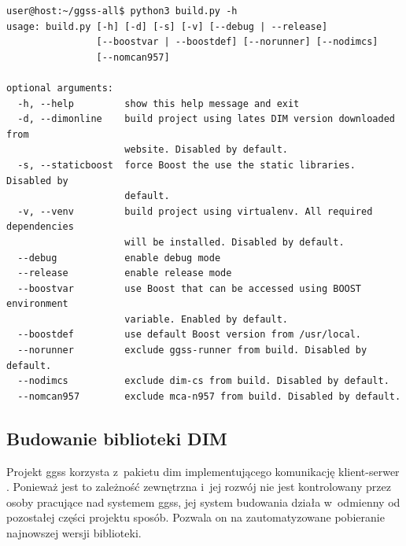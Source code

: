 \begin{lstlisting}[language=Cmd, caption={Użycie skryptu \textit{build.py} z~opcją \lstinline{-h} powodujące wyświetlenie możliwych do wykorzystania parametrów. Widoczne m.in. parametry \lstinline{--nomcan957}, \lstinline{--nodimcs} oraz \lstinline{--norunner} pozwalające użytkownikowi na wykluczenie niektórych aplikacji wchodzących w~skład projektu \gls*{ggss} z~procesu budowania.}, label={lst:buildpy2}]
user@host:~/ggss-all$ python3 build.py -h
usage: build.py [-h] [-d] [-s] [-v] [--debug | --release]
                [--boostvar | --boostdef] [--norunner] [--nodimcs]
                [--nomcan957]

optional arguments:
  -h, --help         show this help message and exit
  -d, --dimonline    build project using lates DIM version downloaded from
                     website. Disabled by default.
  -s, --staticboost  force Boost the use the static libraries. Disabled by
                     default.
  -v, --venv         build project using virtualenv. All required dependencies
                     will be installed. Disabled by default.
  --debug            enable debug mode
  --release          enable release mode
  --boostvar         use Boost that can be accessed using BOOST environment
                     variable. Enabled by default.
  --boostdef         use default Boost version from /usr/local.
  --norunner         exclude ggss-runner from build. Disabled by default.
  --nodimcs          exclude dim-cs from build. Disabled by default.
  --nomcan957        exclude mca-n957 from build. Disabled by default.

\end{lstlisting}


\subsection{Budowanie biblioteki DIM}
Projekt \gls*{ggss} korzysta z~pakietu \gls*{dim} implementującego komunikację klient-serwer \cite{DIMwebsite}. Ponieważ jest to zależność zewnętrzna i~jej rozwój nie jest kontrolowany przez osoby pracujące nad systemem \gls*{ggss}, jej system budowania działa w~odmienny od pozostałej części projektu sposób. Pozwala on na zautomatyzowane pobieranie najnowszej wersji biblioteki.

